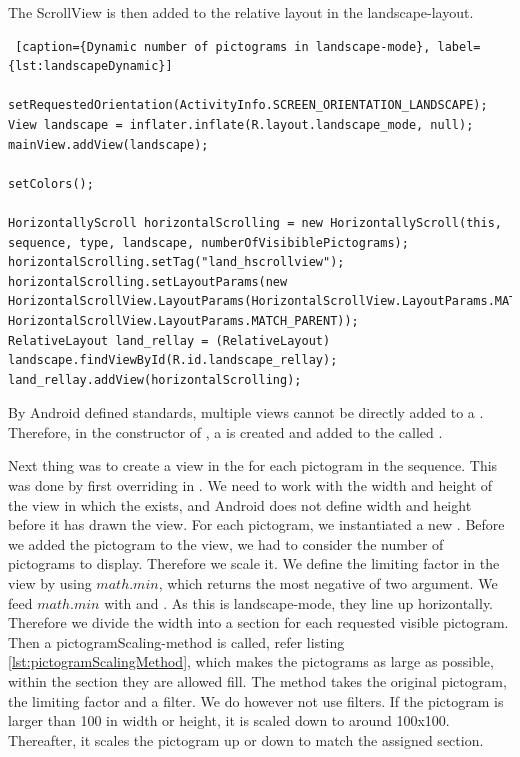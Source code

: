 The ScrollView is then added to the relative layout in the landscape-layout.

\begin{lstlisting} [caption={Dynamic number of pictograms in landscape-mode}, label={lst:landscapeDynamic}]

setRequestedOrientation(ActivityInfo.SCREEN_ORIENTATION_LANDSCAPE);
View landscape = inflater.inflate(R.layout.landscape_mode, null);
mainView.addView(landscape);
	
setColors();
	
HorizontallyScroll horizontalScrolling = new HorizontallyScroll(this, sequence, type, landscape, numberOfVisibiblePictograms);
horizontalScrolling.setTag("land_hscrollview");
horizontalScrolling.setLayoutParams(new HorizontalScrollView.LayoutParams(HorizontalScrollView.LayoutParams.MATCH_PARENT, HorizontalScrollView.LayoutParams.MATCH_PARENT));
RelativeLayout land_rellay = (RelativeLayout) landscape.findViewById(R.id.landscape_rellay);
land_rellay.addView(horizontalScrolling);
\end{lstlisting}

By Android defined standards, multiple views cannot be directly added to a . Therefore, in the constructor of , a  is created and added to the  called . 

Next thing was to create a view in the  for each pictogram in the sequence. This was done by first overriding  in . We need to work with the width and height of the view in which the  exists, and Android does not define width and height before it has drawn the view. For each pictogram, we instantiated a new . Before we added the pictogram to the view, we had to consider the number of pictograms to display. Therefore we scale it. We define the limiting factor in the view by using $math.min$, which returns the most negative of two argument. We feed $math.min$ with  and . As this is landscape-mode, they line up horizontally. Therefore we divide the width into a section for each requested visible pictogram. Then a pictogramScaling-method is called, refer listing \ref{lst:pictogramScalingMethod}, which makes the pictograms as large as possible, within the section they are allowed fill. The method takes the original pictogram, the limiting factor and a filter. We do however not use filters. If the pictogram is larger than 100 in width or height, it is scaled down to around 100x100. Thereafter, it scales the pictogram up or down to match the assigned section. 

